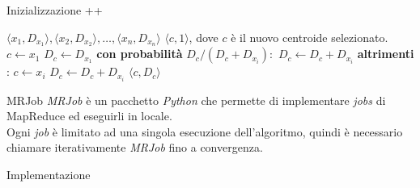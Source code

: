 \documentclass{beamer}
\begin{document}
\begin{frame}{Inizializzazione ++}
    \begin{algorithm}[H]
        \caption{\textit{Inizializzazione ++ reduce}}
        \begin{algorithmic}[1]
            \Require $\langle  x_1, D_{x_1}\rangle, \langle  x_2, D_{x_2}\rangle, \ldots,  \langle  x_n, D_{x_n}\rangle$
            \Ensure $\langle c, 1 \rangle $, dove $c$ è il nuovo centroide selezionato.
            \State $c \leftarrow x_1$
            \State $D_c \leftarrow D_{x_1}$
            \State \textbf{con probabilità }$D_c / (D_c + D_{x_i}):$ 
            \State \hspace*{0.5cm} $D_c \leftarrow D_c + D_{x_i}$
            \State \textbf{altrimenti} :
            \State \hspace*{0.5cm} $c \leftarrow x_i$
            \State \hspace*{0.5cm} $D_c \leftarrow D_c + D_{x_i}$
            \EndFor
            \State\Return $\langle c, D_c \rangle $
        \end{algorithmic}
    \end{algorithm}
\end{frame}

\begin{frame}{MRJob}
    \textit{MRJob} è un pacchetto \textit{Python} che permette di implementare \textit{jobs} di MapReduce
    ed eseguirli in locale.\\[.5cm]
    \pause
    Ogni \textit{job} è limitato ad una singola esecuzione dell'algoritmo, quindi è necessario
    chiamare iterativamente \textit{MRJob} fino a convergenza.
\end{frame}

\begin{frame}{Implementazione}
    \vspace{-0.4cm}
\end{frame}
\end{document}
